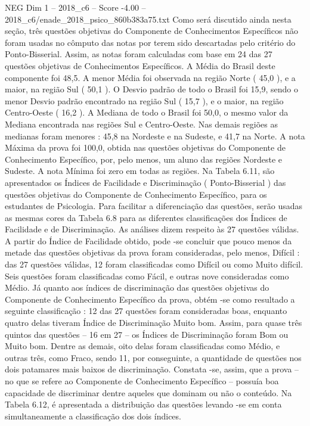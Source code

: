\begin{textsample}{NEG Dim 1 – 2018\_c6 – Score -4.00 – 2018\_c6/enade\_2018\_psico\_860b383a75.txt}
Como será discutido ainda nesta seção, três questões objetivas do Componente de Conhecimentos Específicos não foram usadas no cômputo das notas por terem sido descartadas pelo critério do Ponto-Bisserial.
Assim, as notas foram calculadas com base em 24 das 27 questões objetivas de Conhecimentos Específicos.
A Média do Brasil deste componente foi 48,5.
A menor Média foi observada na região Norte ( 45,0 ), e a maior, na região Sul ( 50,1 ).
O Desvio padrão de todo o Brasil foi 15,9, sendo o menor Desvio padrão encontrado na região Sul ( 15,7 ), e o maior, na região Centro-Oeste ( 16,2 ).
A Mediana de todo o Brasil foi 50,0, o mesmo valor da Mediana encontrada nas regiões Sul e Centro-Oeste.
Nas demais regiões as medianas foram menores : 45,8 na Nordeste e na Sudeste, e 41,7 na Norte.
A nota Máxima da prova foi 100,0, obtida nas questões objetivas do Componente de Conhecimento Específico, por, pelo menos, um aluno das regiões Nordeste e Sudeste.
A nota Mínima foi zero em todas as regiões.
Na Tabela 6.11, são apresentados os Índices de Facilidade e Discriminação ( Ponto-Bisserial ) das questões objetivas do Componente de Conhecimento Específico, para os estudantes de Psicologia.
Para facilitar a diferenciação das questões, serão usadas as mesmas cores da Tabela 6.8 para as diferentes classificações dos Índices de Facilidade e de Discriminação.
As análises dizem respeito às 27 questões válidas.
A partir do Índice de Facilidade obtido, pode -se concluir que pouco menos da metade das questões objetivas da prova foram consideradas, pelo menos, Difícil : das 27 questões válidas, 12 foram classificadas como Difícil ou como Muito difícil.
Seis questões foram classificadas como Fácil, e outras nove consideradas como Médio.
Já quanto aos índices de discriminação das questões objetivas do Componente de Conhecimento Específico da prova, obtém -se como resultado a seguinte classificação : 12 das 27 questões foram consideradas boas, enquanto quatro delas tiveram Índice de Discriminação Muito bom.
Assim, para quase três quintos das questões – 16 em 27 – os Índices de Discriminação foram Bom ou Muito bom.
Dentre as demais, oito delas foram classificadas como Médio, e outras três, como Fraco, sendo 11, por conseguinte, a quantidade de questões nos dois patamares mais baixos de discriminação.
Constata -se, assim, que a prova – no que se refere ao Componente de Conhecimento Específico – possuía boa capacidade de discriminar dentre aqueles que dominam ou não o conteúdo.
Na Tabela 6.12, é apresentada a distribuição das questões levando -se em conta simultaneamente a classificação dos dois índices.

\end{textsample}

